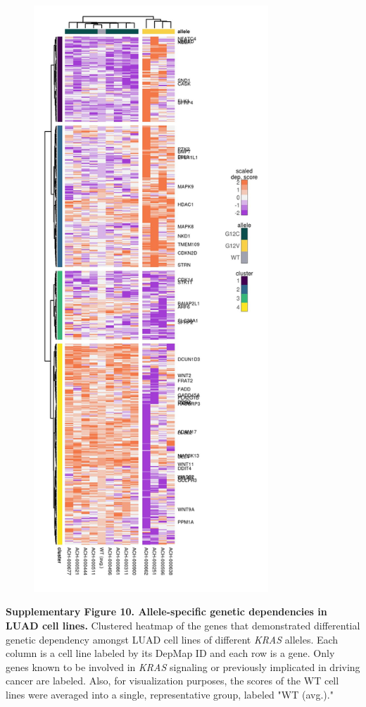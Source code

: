 \documentclass[english, 10pt, letterpaper]{article}
\newcommand{\KRAS}{\emph{KRAS}}
\begin{document}
\begin{figure}[h!]
\centering
\includegraphics[width=88mm]{figures/Supp_Fig_10.jpeg}
\label{sfig:luad-dependency-heatmap}
\end{figure}

\newpage
\noindent \textbf{Supplementary Figure 10. Allele-specific genetic dependencies in LUAD cell lines.}
Clustered heatmap of the genes that demonstrated differential genetic dependency amongst LUAD cell lines of different \KRAS{} alleles. Each column is a cell line labeled by its DepMap ID and each row is a gene. Only genes known to be involved in \KRAS{} signaling or previously implicated in driving cancer are labeled. Also, for visualization purposes, the scores of the WT cell lines were averaged into a single, representative group, labeled "WT (avg.)."
\newpage
\end{document}
